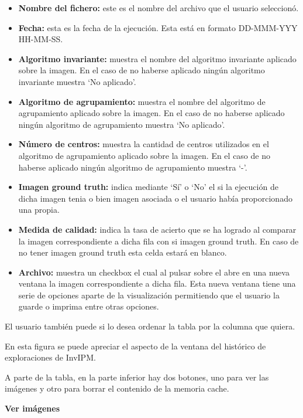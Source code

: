 \begin{itemize}
    \item \textbf{Nombre del fichero:} este es el nombre del archivo que el usuario seleccionó.
    \item \textbf{Fecha:} esta es la fecha de la ejecución. Esta está en formato DD-MMM-YYY HH-MM-SS.
    \item \textbf{Algoritmo invariante:} muestra el nombre del algoritmo invariante aplicado sobre la imagen. En el caso de no haberse aplicado ningún algoritmo invariante muestra `No aplicado'.
    \item \textbf{Algoritmo de agrupamiento:} muestra el nombre del algoritmo de agrupamiento aplicado sobre la imagen. En el caso de no haberse aplicado ningún algoritmo de agrupamiento muestra `No aplicado'.
    \item \textbf{Número de centros:} muestra la cantidad de centros utilizados en el algoritmo de agrupamiento aplicado sobre la imagen. En el caso de no haberse aplicado ningún algoritmo de agrupamiento muestra `-'.
    \item \textbf{Imagen ground truth:} indica mediante `Sí' o `No' el si la ejecución de dicha imagen tenia o bien imagen asociada o el usuario había proporcionado una propia.
    \item \textbf{Medida de calidad:} indica la tasa de acierto que se ha logrado al comparar la imagen correspondiente a dicha fila con si imagen ground truth. En caso de no tener imagen ground truth esta celda estará en blanco.
    \item \textbf{Archivo:} muestra un checkbox el cual al pulsar sobre el abre en una nueva ventana la imagen correspondiente a dicha fila. Esta nueva ventana tiene una serie de opciones aparte de la visualización permitiendo que el usuario la guarde o imprima entre otras opciones.
\end{itemize}

El usuario también puede si lo desea ordenar la tabla por la columna que quiera.


En esta figura se puede apreciar el aspecto de la ventana del histórico de exploraciones de InvIPM.

A parte de la tabla, en la parte inferior hay dos botones, uno para ver las imágenes y otro para borrar el contenido de la memoria cache. 

\textbf{Ver imágenes}\label{ver-imágenes}

